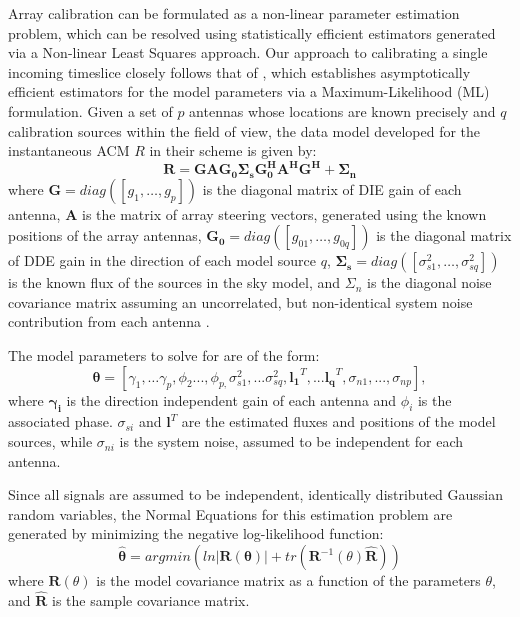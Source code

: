 \documentclass{aa}
\begin{document}
Array  calibration  can  be  formulated  as a  non-linear  parameter  estimation
problem,  which  can  be   resolved  using  statistically  efficient  estimators
generated via a Non-linear Least Squares approach. Our approach to calibrating a
single      incoming      timeslice       closely      follows      that      of
\citep{wijnholds2009multisource},  which  establishes  asymptotically  efficient
estimators   for   the   model   parameters  via   a   Maximum-Likelihood   (ML)
formulation. Given a set of $p$ antennas whose locations are known precisely and
$q$ calibration sources  within the field of view, the  data model developed for
the instantaneous ACM $R$ in their scheme is given by:
\begin{equation}
\mathbf{R=GAG_{0}\Sigma_{s}G_{0}^{H}A^{H}G^{H}+\Sigma_{n}}\label{eq:datamodel}
\end{equation}
where    \textbf{$\mathbf{G=}diag(\left[g_{1},\ldots,g_{p}\right])$    }is   the
diagonal matrix of DIE gain of each antenna, $\mathbf{A}$ is the matrix of array
steering vectors,  generated using  the known positions  of the  array antennas,
$\mathbf{G_{0}=}diag(\left[g_{01},\ldots,g_{0q}\right])$ is  the diagonal matrix
of    DDE   gain    in   the    direction    of   each    model   source    $q$,
$\mathbf{\Sigma_{s}}=diag\left(\left[\sigma_{s1}^{2},\ldots,\sigma_{sq}^{2}\right]\right)$
is the  known flux  of the  sources in the  sky model,  and $\Sigma_{n}$  is the
diagonal  noise covariance  matrix assuming  an uncorrelated,  but non-identical
system noise contribution from each antenna .

The model parameters to solve for are of the form:
\begin{equation}
\bm{\theta}=[\gamma_{1},\ldots\gamma_{p},\phi_{2}...,\phi_{p,}\sigma_{s1}^{2},...\sigma_{sq}^{2},\mathbf{l_{1}}^{T},...\mathbf{l_{q}}^{T},\sigma_{n1},...,\sigma_{np}],\label{eq:estparam}
\end{equation}
 where $\mathbf{\gamma_{i}}$  is the direction independent gain  of each antenna
 and $\phi_{i}$ is the  associated phase. $\sigma_{si}$ and $\mathbf{l}^{T}$ are
 the estimated fluxes and positions of the model sources, while $\sigma_{ni}$ is
 the system noise, assumed to be independent for each antenna.

Since  all  signals  are  assumed  to be  independent,  identically  distributed
Gaussian random variables, the Normal  Equations for this estimation problem are
generated by minimizing the negative log-likelihood function:
\begin{equation}
\bm{\hat{\theta}}=argmin\left(ln|\mathbf{R(\theta)}|+tr(\mathbf{R}^{-1}(\theta)\mathbf{\widehat{R}})\right)\label{eq:normeq}
\end{equation}
 where $\mathbf{R}(\theta)$ is the model  covariance matrix as a function of the
 parameters  $\theta$,  and  $\mathbf{\widehat{R}}$  is  the  sample  covariance
 matrix.
\end{document}
